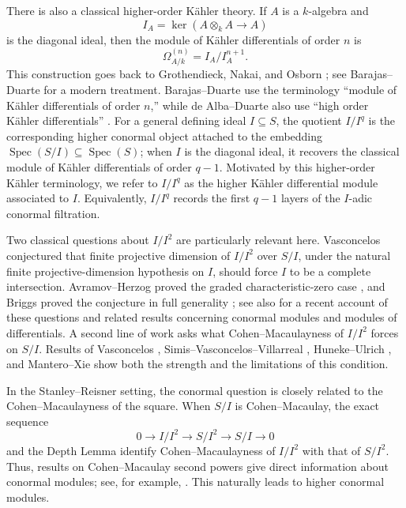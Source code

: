 \documentclass[12pt]{amsart}
\theoremstyle{plain}
\theoremstyle{definition}
\theoremstyle{remark}
\begin{document}
There is also a classical higher-order K\"ahler theory. If $A$ is a
$k$-algebra and
$$
I_A=\ker(A\otimes_kA\longrightarrow A)
$$
is the diagonal ideal, then the module of K\"ahler differentials of order $n$
is
$$
\Omega^{(n)}_{A/k}=I_A/I_A^{n+1}.
$$
This construction goes back to Grothendieck, Nakai, and Osborn
\cite{Grothendieck,Nakai,Osborn}; see Barajas--Duarte \cite{BarajasDuarte}
for a modern treatment. Barajas--Duarte use the terminology ``module of
K\"ahler differentials of order $n$,'' while de Alba--Duarte also use
``high order K\"ahler differentials'' \cite{DeAlbaDuarte}. For a general
defining ideal $I\subseteq S$, the quotient $I/I^q$ is the corresponding
higher conormal object attached to the embedding
$\operatorname{Spec}(S/I)\subseteq\operatorname{Spec}(S)$; when $I$ is the
diagonal ideal, it recovers the classical module of K\"ahler differentials
of order $q-1$. Motivated by this higher-order K\"ahler terminology, we
refer to $I/I^q$ as the higher K\"ahler differential module associated to
$I$. Equivalently, $I/I^q$ records the first $q-1$ layers of the $I$-adic
conormal filtration.

Two classical questions about $I/I^2$ are particularly relevant here.
Vasconcelos conjectured that finite projective dimension of $I/I^2$ over
$S/I$, under the natural finite projective-dimension hypothesis on $I$, should
force $I$ to be a complete intersection. Avramov--Herzog proved the graded
characteristic-zero case \cite{AvramovHerzog}, and Briggs proved the
conjecture in full generality \cite{Briggs};
see also \cite{HerzogBriggsIyengar} for a recent account of these questions and related results concerning conormal modules and modules of differentials.
A second line of work asks what
Cohen--Macaulayness of $I/I^2$ forces on $S/I$. Results of Vasconcelos
\cite{VasconcelosKoszul}, Simis--Vasconcelos--Villarreal
\cite{SimisVasconcelosVillarreal}, Huneke--Ulrich \cite{HunekeUlrich}, and
Mantero--Xie \cite{ManteroXie} show both the strength and the limitations of
this condition.

In the Stanley--Reisner setting, the conormal question is closely related to
the Cohen--Macaulayness of the square. When $S/I$ is Cohen--Macaulay, the
exact sequence
$$
0\longrightarrow I/I^2\longrightarrow S/I^2\longrightarrow S/I\longrightarrow0
$$
and the Depth Lemma identify Cohen--Macaulayness of $I/I^2$ with that of
$S/I^2$. Thus, results on Cohen--Macaulay second powers give direct information
about conormal modules; see, for example,
\cite{FaridiHibi,MinhTrung2009,RinaldoTerai,RinaldoTeraiYoshida,TrungTuan}.
This naturally leads to higher conormal modules.
\end{document}
